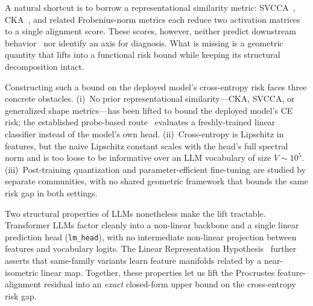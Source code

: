 \documentclass{article}
\begin{document}
A natural shortcut is to borrow a representational similarity metric: SVCCA~\cite{raghu2017svcca}, CKA~\cite{kornblith2019similarity}, and related Frobenius-norm metrics each reduce two activation matrices to a single alignment score.
These scores, however, neither predict downstream behavior~\cite{ding2021grounding, davari2023reliability, klabunde2023similarity} nor identify an axis for diagnosis.
What is missing is a geometric quantity that lifts into a functional risk bound while keeping its structural decomposition intact.

Constructing such a bound on the deployed model's cross-entropy risk faces three concrete obstacles. (i)~No prior representational similarity---CKA, SVCCA, or generalized shape metrics---has been lifted to bound the deployed model's CE risk; the established probe-based route~\cite{harvey2024what} evaluates a freshly-trained linear classifier instead of the model's own head. (ii)~Cross-entropy is Lipschitz in features, but the naive Lipschitz constant scales with the head's full spectral norm and is too loose to be informative over an LLM vocabulary of size $V \sim 10^5$. (iii)~Post-training quantization and parameter-efficient fine-tuning are studied by separate communities, with no shared geometric framework that bounds the same risk gap in both settings.

Two structural properties of LLMs nonetheless make the lift tractable.
Transformer LLMs factor cleanly into a non-linear backbone and a single linear prediction head (\texttt{lm\_head}), with no intermediate non-linear projection between features and vocabulary logits.
The Linear Representation Hypothesis~\cite{moschella2022relative, park2023linear} further asserts that same-family variants learn feature manifolds related by a near-isometric linear map.
Together, these properties let us lift the Procrustes feature-alignment residual into an \emph{exact} closed-form upper bound on the cross-entropy risk gap.
\end{document}

